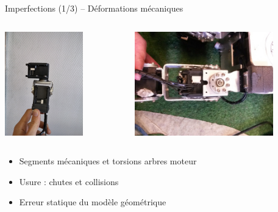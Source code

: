 \begin{frame}{Imperfections (1/3) -- Déformations mécaniques}
    \begin{columns}
        \begin{column}{0.5\linewidth}
            \centering
            \includegraphics[height=4.5cm]{../media/torsion_meca1.jpg}
        \end{column}
        \begin{column}{0.5\linewidth}
            \centering
            \includegraphics[height=4.5cm]{../media/torsion_meca2.jpg}
        \end{column}
    \end{columns}
    \vspace{1.0em}
    \begin{itemize}
        \item Segments mécaniques et torsions arbres moteur
        \item Usure : chutes et collisions
        \item Erreur statique du modèle géométrique
    \end{itemize}
\end{frame}

